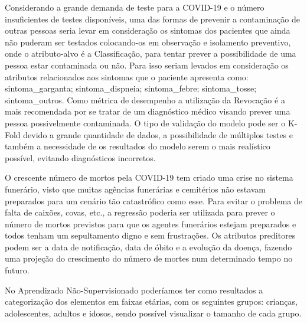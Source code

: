 \documentclass[12pt]{article}
\begin{document}
Considerando a grande demanda de teste para a COVID-19 e o número insuficientes de testes disponíveis, uma das formas de prevenir a contaminação de outras pessoas seria levar em consideração os sintomas dos pacientes que ainda não puderam ser testados colocando-os em observação e isolamento preventivo, onde o atributo-alvo é a Classificação, para tentar prever a possibilidade de uma pessoa estar contaminada ou não. Para isso seriam levados em consideração os atributos relacionados aos sintomas que o paciente apresenta como: sintoma\_garganta; sintoma\_dispneia; sintoma\_febre; sintoma\_tosse; sintoma\_outros. Como métrica de desempenho a utilização da Revocação é a mais recomendada por se tratar de um diagnóstico médico visando prever uma pessoa possivelmente contaminada. O tipo de validação do modelo pode ser o K-Fold devido a grande quantidade de dados, a possibilidade de múltiplos testes e também a necessidade de os resultados do modelo serem o mais realístico possível, evitando diagnósticos incorretos.

O crescente número de mortos pela COVID-19 tem criado uma crise no sistema funerário, visto que muitas agências funerárias e cemitérios não estavam preparados para um cenário tão catastrófico como esse. Para evitar o problema de falta de caixões, covas, etc., a regressão poderia ser utilizada para prever o número de mortos previstos para que os agentes funerários estejam preparados e todos tenham um sepultamento digno e sem frustrações. Os atributos preditores podem ser a data de notificação, data de óbito e a evolução da doença, fazendo uma projeção do crescimento do número de mortes num determinado tempo no futuro.

No Aprendizado Não-Supervisionado poderíamos ter como resultados a categorização dos elementos em faixas etárias, com os seguintes grupos: crianças, adolescentes, adultos e idosos, sendo possível visualizar o tamanho de cada grupo.

%
%
\end{document}
